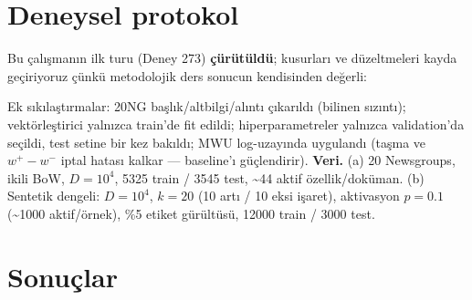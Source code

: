 \documentclass[11pt]{article}
\begin{document}
\section*{Deneysel protokol}
Bu çalışmanın ilk turu (Deney 273) \textbf{çürütüldü}; kusurları ve düzeltmeleri kayda geçiriyoruz çünkü metodolojik ders sonucun kendisinden değerli:
\begin{center}\small{}\end{center}
Ek sıkılaştırmalar: 20NG başlık/altbilgi/alıntı çıkarıldı (bilinen sızıntı); vektörleştirici yalnızca train'de fit edildi; hiperparametreler yalnızca validation'da seçildi, test setine bir kez bakıldı; MWU log-uzayında uygulandı (taşma ve $w^+{-}w^-$ iptal hatası kalkar — baseline'ı güçlendirir).
\textbf{Veri.} (a) 20 Newsgroups, ikili BoW, $D{=}10^4$, 5325 train / 3545 test, \textasciitilde{}44 aktif özellik/doküman. (b) Sentetik dengeli: $D{=}10^4$, $k{=}20$ (10 artı / 10 eksi işaret), aktivasyon $p{=}0.1$ (\textasciitilde{}1000 aktif/örnek), \%5 etiket gürültüsü, 12000 train / 3000 test.
\section*{Sonuçlar}
\end{document}
